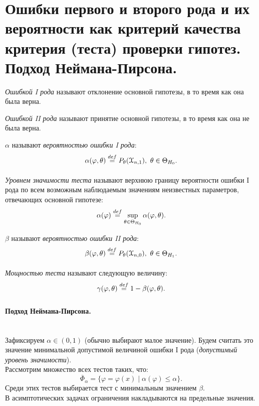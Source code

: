 \section{Ошибки первого и второго рода и их вероятности как критерий качества
критерия (теста) проверки гипотез. Подход Неймана-Пирсона.}

\begin{definition}
  \textit{Ошибкой I рода} называют отклонение основной гипотезы, в то
  время как она была верна.
\end{definition}

\begin{definition}
  \textit{Ошибкой II рода} называют принятие основной гипотезы, в то
  время как она не была верна.
\end{definition}

\begin{definition}
  $\alpha$ называют \textit{вероятностью ошибки I рода}:
  \[
    \alpha(\varphi, \theta) \overset{def}{\underset{}{=}} P_{\theta}(\mathcal{X}_{n, 1}),~
    \theta \in \Theta_{H_0}
  .\]
\end{definition}

\begin{definition}
  \textit{Уровнем значимости теста} называют верхнюю границу вероятности ошибки
  I рода по всем возможным наблюдаемым значениям неизвестных параметров,
  отвечающих основной гипотезе:
  \[
    \alpha(\varphi) \overset{def}{\underset{}{=}} \sup_{\theta \in \Theta_{H_0}} \alpha(\varphi, \theta)
  .\]
\end{definition}

\begin{definition}
  $\beta$ называют \textit{вероятностью ошибки II рода}:
  \[
    \beta(\varphi, \theta) \overset{def}{\underset{}{=}} P_{\theta}(\mathcal{X}_{n, 0}),~
    \theta \in \Theta_{H_1}
  .\]
\end{definition}

\begin{definition}
  \textit{Мощностью теста} называют следующую величину:
  \[
    \gamma(\varphi, \theta) \overset{def}{\underset{}{=}} 1 - \beta(\varphi, \theta)
  .\]
\end{definition}

\paragraph{Подход Неймана-Пирсона.}\mbox{}\\
Зафиксируем $\alpha \in (0, 1)$ (обычно выбирают малое значение). Будем считать
это значение минимальной допустимой величиной ошибки I рода (\textit{допустимый
уровень значимости}).\\
Рассмотрим множество всех тестов таких, что:
\[
  \overline{\Phi}_\alpha = \{\varphi = \varphi(x) \mid \alpha(\varphi) \leqslant
  \alpha\}
.\]
Среди этих тестов выбирается тест с минимальным значением $\beta$.\\
В асимптотических задачах ограничения накладываются на предельные значения.
